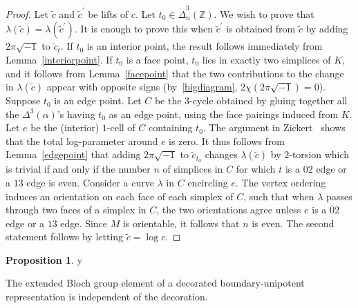 \documentclass[11pt]{amsart}
\theoremstyle{definition}
\newtheorem{proposition}[theorem]{Proposition}
\numberwithin{equation}{section}
\def\printname#1{
        \if\draft y
                \smash{\makebox[0pt]{\hspace{-0.5in}
                        \raisebox{8pt}{\tt\tiny #1}}}
        \fi
}
\def\lbl#1{\label{#1}\printname{#1}}
\newcommand{\Z}{\mathbb Z}
\begin{document}
\begin{proof} 
Let $\widetilde c$ and $\widetilde c^\prime$ be lifts of $c$. Let 
$t_0\in\dot\Delta^3_n(\Z)$. We wish to prove that 
$\lambda(\widetilde c)=\lambda(\widetilde c^\prime)$. It is enough to prove 
this when $\widetilde c^\prime$ is obtained from $\widetilde c$ by adding 
$2\pi\sqrt{-1}$ to $\widetilde c_t$. If $t_0$ is an interior point, the 
result follows immediately from Lemma~\ref{interiorpoint}.
If $t_0$ is a face point, $t_0$ lies in exactly two simplices of $K$, and 
it follows from Lemma~\ref{facepoint} that the two contributions to the 
change in $\lambda(\widetilde c)$ appear with opposite signs (by~\eqref{bigdiagram}, 
$2\chi(2\pi\sqrt{-1})=0$). Suppose $t_0$ is an edge point. Let $C$ be the 
$3$-cycle obtained by gluing together all the $\Delta^3(\alpha)$'s having 
$t_0$ as an edge point, using the face pairings induced from $K$. Let $e$ 
be the (interior) $1$-cell of $C$ containing $t_0$. The argument in 
Zickert~\cite[Theorem~6.5]{ZickertDuke} shows that the total log-parameter 
around $e$ is zero. It thus follows from Lemma~\ref{edgepoint} that adding 
$2\pi\sqrt{-1}$ to $\widetilde c_{t_0}$ changes $\lambda(\widetilde c)$ by 
$2$-torsion which is trivial if and only if the number $n$ of simplices in 
$C$ for which $t$ is a $02$ edge or a $13$ edge is even. Consider a curve 
$\lambda$ in $C$ encircling $e$. The vertex ordering induces an orientation 
on each face of each simplex of $C$, such that when $\lambda$ passes through 
two faces of a simplex in $C$, the two orientations agree unless $e$ is a 
$02$ edge or a $13$ edge. Since $M$ is orientable, it follows that $n$ is even.
The second statement follows by letting $\widetilde c=\log c$.
\end{proof}

 
\begin{proposition}
\lbl{independenceofdec} 
The extended Bloch group element of a decorated 
boundary-unipotent representation is independent of the decoration.
\end{proposition}
\end{document}
